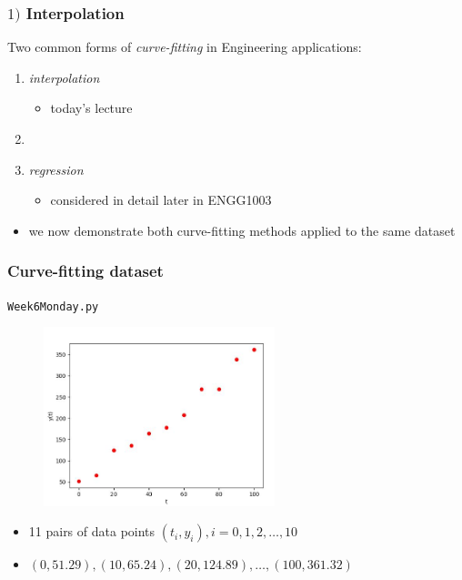 \documentclass[english,14pt]{beamer}
\newcommand\red[1]{{\color{red} #1}}
\begin{document}
\begin{frame}[fragile]

\frametitle{$1)$ Interpolation}

Two common forms of \red{\emph{curve-fitting}} in Engineering applications:

\begin{enumerate}
	\item \red{\emph{interpolation}}
	\begin{itemize}
		\item today's lecture
	\end{itemize}
	\item[]
	\item \red{\emph{regression}}
	\begin{itemize}
		\item considered in detail later in ENGG1003
	\end{itemize}
\end{enumerate}
	
\begin{itemize}
	\item we now demonstrate both curve-fitting methods applied to the same dataset
\end{itemize}

\end{frame}


\begin{frame}[fragile]

\frametitle{Curve-fitting dataset}

\texttt{Week6Monday.py}
\vspace*{-3mm}
\begin{figure}[ht]
	\centering
	\includegraphics[width=0.6\textwidth]{figures/Week6MonDataset}
\end{figure}
\vspace*{-5mm}
\begin{itemize}
	\item 11 pairs of data points $(t_i,y_i), i = 0,1,2,\ldots,10$
	\item[] {\small $(0,51.29), (10,65.24), (20,124.89), \ldots,(100,361.32)$}
\end{itemize}

\end{frame}
\end{document}
